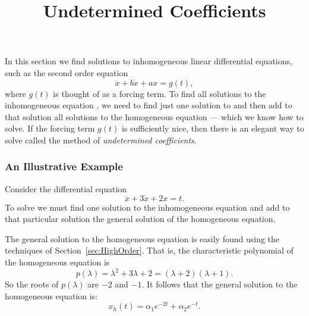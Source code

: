\documentclass{ximera}
\title{Undetermined Coefficients}
\begin{document}
\begin{abstract}
\end{abstract}
\maketitle


\label{sec:2norderinhom}

In this section we find solutions to inhomogeneous linear differential 
equations, such as the second order equation
\begin{equation}  \label{e:inhom1}
\ddot{x} + b\dot{x} + ax = g(t),
\end{equation}
where $g(t)$ is thought of as a forcing term.   
To find all solutions to 
the inhomogeneous 
equation , we need to find just one solution
to  and then add to that solution all solutions to the 
homogeneous equation --- which we know how to solve.  If the forcing term 
$g(t)$ is sufficiently nice, then there is an elegant way to solve 
 called the method of 
{\em undetermined coefficients}.


\subsubsection*{An Illustrative Example}

Consider the differential equation
\begin{equation}  \label{eq:undetcoeffex}
\ddot{x} + 3\dot{x}+2x = t.
\end{equation}
To solve  we must find one solution to the inhomogeneous
equation and add to that particular solution the 
general solution of the 
homogeneous equation.  

The general solution to the homogeneous equation is easily found using the
techniques of Section~\ref{sec:HighOrder}.  That is, the characteristic 
polynomial of the homogeneous equation is 
\[
p(\lambda) = \lambda^2 + 3\lambda + 2 = (\lambda+2)(\lambda+1).
\]
So the roots of $p(\lambda)$ are $-2$ and $-1$.  It follows that the general
solution to the homogeneous equation is:
\[
x_h(t)= \alpha_1e^{-2t} + \alpha_2e^{-t}.
\]
\end{document}
